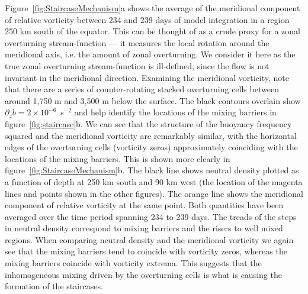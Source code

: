 Figure~\ref{fig:StaircaseMechanism}a shows the average of the meridional component of relative vorticity between 234 and 239  days of model integration in a region 250 km south of the equator. This can be thought of as a crude proxy for a zonal overturning stream-function --- it measures the local rotation around the meridional axis, i.e. the amount of zonal overturning. We consider it here as the true zonal overturning stream-function is ill-defined, since the flow is not invariant in the meridional direction. Examining the meridional vorticity, note that there are a series of counter-rotating stacked overturning cells between around 1,750 m and 3,500 m below the surface. The black contours overlain show $\partial_z b = 2 \times 10^{-6}$~s$^{-2}$ and help identify the locations of the mixing barriers in figure~\ref{fig:staircase}b. We can see that the structure of the buoyancy frequency squared and the meridional vorticity are remarkably similar, with the horizontal edges of the overturning cells (vorticity zeros) approximately coinciding with the locations of the mixing barriers. This is shown more clearly in figure~\ref{fig:StaircaseMechanism}b. The black line shows neutral density plotted as a function of  depth at 250 km south and 90 km west (the location of the magenta lines and points shown in the other  figures). The orange line shows the meridional component of relative vorticity at the same point. Both quantities  have  been averaged over the time period spanning 234 to 239 days. The treads of the steps in neutral density correspond to mixing barriers and the risers to well mixed regions. When comparing neutral density and the meridional vorticity we again see that the mixing barriers tend to coincide with vorticity zeros, whereas the mixing barriers coincide with vorticity extrema. This suggests that the inhomogeneous mixing driven by the overturning cells is what is causing the formation of the staircases.

